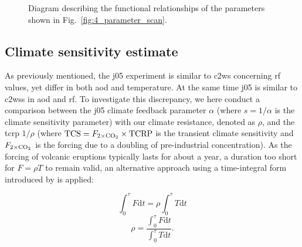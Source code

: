 \documentclass{ametsocV6.1}
\begin{document}
\begin{figure}
  \centering


  \caption{Diagram describing the functional relationships of the parameters shown in
    Fig.~\ref{fig:4_parameter_scan}.}\label{fig:5_diagram_of_function_relations}%
\end{figure}

\subsection{Climate sensitivity estimate}

As previously mentioned, the \gls{j05} experiment is similar to \gls{c2ws} concerning
\gls{rf} values, yet differ in both \gls{aod} and temperature. At the same time
\gls{j05} is similar to \gls{c2wss} in \gls{aod} and \gls{rf}. To investigate this
discrepancy, we here conduct a comparison between the \gls{j05} climate feedback
parameter \(\alpha\) (where \(s=1/\alpha\) is the climate sensitivity parameter) with
our climate resistance, denoted as \(\rho\), and the \gls{tcrp} \(1/\rho\) (where
\(\mathrm{TCS}=F_{2\times\ce{CO2}}\times \mathrm{TCRP}\) is the transient climate
sensitivity and \(F_{2\times\ce{CO2}}\) is the forcing due to a doubling of
pre-industrial  concentration). As the forcing of volcanic eruptions typically
lasts for about a year, a duration too short for \(F=\rho T\) to remain valid, an
alternative approach using a time-integral form introduced by \citet{merlis2014} is
applied:

\begin{equation}
  \int_0^{\tau}F \mathrm{d}t=\rho\int_{0}^{\tau}T \mathrm{d}t
  \label{eq:climate-resistance-orig}
\end{equation}
\begin{equation}
  \rho=\frac{\int_0^{\tau}F \mathrm{d}t}{\int_{0}^{\tau}T \mathrm{d}t}.
  \label{eq:climate-resistance}
\end{equation}
\end{document}
